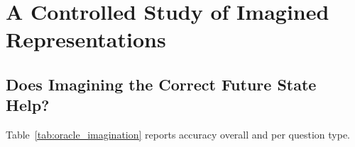 \documentclass[twocolumn]{article}
\begin{document}

\section*{A Controlled Study of Imagined Representations}
\subsection*{Does Imagining the Correct Future State Help?}
Table~\ref{tab:oracle_imagination} reports accuracy overall and per question type.
\end{document}
